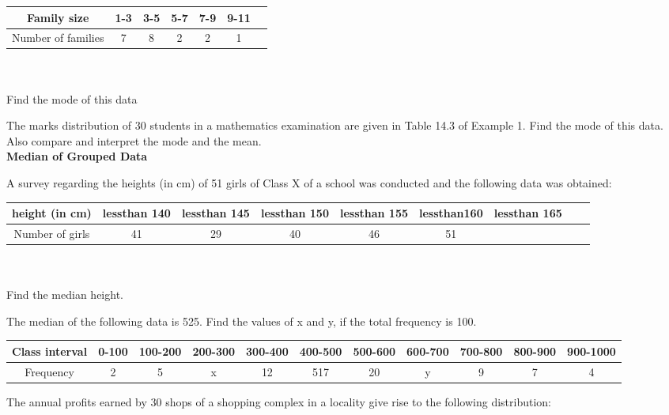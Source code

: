\begin{tabular}{|c|c|c|c|c|c|c|}
\hline
Family size &1-3&3-5&5-7&7-9&9-11&\\
\hline
Number of families &7&8&2&2&1\\
\hline
\end{tabular}\\\\
Find the mode of this data
\item The marks distribution of 30 students in a mathematics examination are
given in Table 14.3 of Example 1. Find the mode of this data. Also compare and
interpret the mode and the mean.\\
{\Large \textbf{Median of Grouped Data}}
\item A survey regarding the heights (in cm) of 51 girls of Class X of a school
was conducted and the following data was obtained:
\begin{tabular}{|c|c|c|c|c|c|c|c|c|}
\hline
height (in cm) &lessthan 140&lessthan 145&lessthan 150&lessthan 155&lessthan160&lessthan 165\\
\hline
Number of girls &41&29&40&46&51\\
\hline
\end{tabular}\\\\
Find the median height.
\item The median of the following data is 525. Find the values of x and y, if the
total frequency is 100.
\begin{tabular}{|c|c|c|c|c|c|c|c|c|c|c|}
\hline
Class interval &0-100&100-200&200-300&300-400&400-500&500-600&600-700&700-800&800-900&900-1000\\
\hline
Frequency &2&5&x&12&517&20&y&9&7&4\\
\hline
\end{tabular}
\item The annual profits earned by 30 shops of a shopping complex in a locality give rise to  the following distribution:
        
